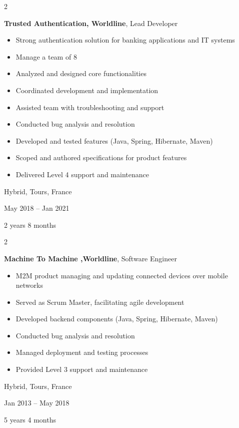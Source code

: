 \documentclass[10pt, letterpaper]{article}
\newenvironment{highlights}{
    \begin{itemize}[
        topsep=0.10 cm,
        parsep=0.10 cm,
        partopsep=0pt,
        itemsep=0pt,
        leftmargin=0.4 cm + 10pt
    ]
}{
    \end{itemize}
} %
\newenvironment{twocolentry}[2][]{
    \onecolentry
    \def\secondColumn{#2}
    \setcolumnwidth{\fill, 4.5 cm}
    \begin{paracol}{2}
}{
    \switchcolumn \raggedleft \secondColumn
    \end{paracol}
    \endonecolentry
} %
\begin{document}
        \vspace{0.2 cm}

        \begin{twocolentry}{
            Hybrid, Tours, France

        May 2018 – Jan 2021

        2 years 8 months
        }
            \textbf{Trusted Authentication, Worldline}, Lead Developer
            \begin{highlights}
                \item Strong authentication solution for banking applications and IT systems
                \item Manage a team of 8
                \item Analyzed and designed core functionalities
                \item Coordinated development and implementation
                \item Assisted team with troubleshooting and support
                \item Conducted bug analysis and resolution
                \item Developed and tested features (Java, Spring, Hibernate, Maven)
                \item Scoped and authored specifications for product features
                \item Delivered Level 4 support and maintenance
            \end{highlights}
        \end{twocolentry}


        \vspace{0.2 cm}

        \begin{twocolentry}{
            Hybrid, Tours, France

        Jan 2013 – May 2018

        5 years 4 months
        }
            \textbf{Machine To Machine ,Worldline}, Software Engineer
            \begin{highlights}
                \item M2M product managing and updating connected devices over mobile networks
                \item Served as Scrum Master, facilitating agile development
                \item Developed backend components (Java, Spring, Hibernate, Maven)
                \item Conducted bug analysis and resolution
                \item Managed deployment and testing processes
                \item Provided Level 3 support and maintenance
            \end{highlights}
        \end{twocolentry}
\end{document}
